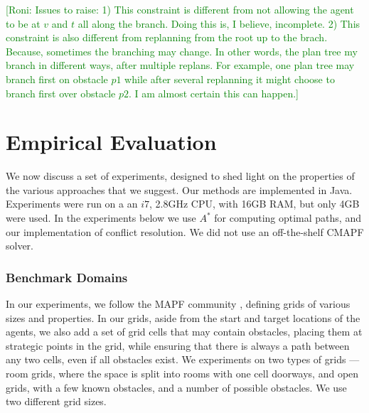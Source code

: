 \documentclass[letterpaper]{article} %
\newcommand{\roni}[1]{{\textcolor{green}{[Roni: #1]}}}
\begin{document}
\roni{Issues to raise:
1) This constraint is different from not allowing the agent to be at $v$ and $t$ all along the branch. Doing this is, I believe, incomplete.
2) This constraint is also different from replanning from the root up to the brach. Because, sometimes the branching may change. In other words, the plan tree my branch in different ways, after multiple replans. For example, one plan tree may branch first on obstacle $p1$ while after several replanning it might choose to branch first over obstacle $p2$. I am almost certain this can happen.}

\section{Empirical Evaluation}

We now discuss a set of experiments, designed to shed light on the properties of the various approaches that we suggest. Our methods are implemented in Java. Experiments were run on a an $i7$, 2.8GHz CPU, with 16GB RAM, but only 4GB were used.
In the experiments below we use $A^*$ for computing optimal paths, and our implementation of conflict resolution. We did not use an off-the-shelf CMAPF solver.


\subsubsection{Benchmark Domains}

In our experiments, we follow the MAPF community \cite{stern2019multi}, defining grids of various sizes and properties. In our grids, aside from the start and target locations of the agents, we also add a set of grid cells that may contain obstacles, placing them at strategic points in the grid, while ensuring that there is always a path between any two cells, even if all obstacles exist.
We experiments on two types of grids --- room grids, where the space is split into rooms with one cell doorways, and open grids, with a few known obstacles, and a number of possible obstacles.
We use two different grid sizes.
\end{document}
